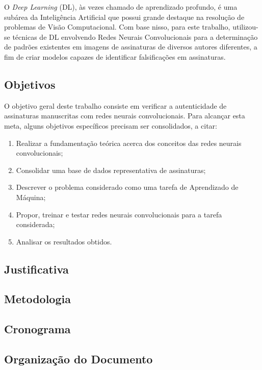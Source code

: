 O \emph{Deep Learning} (DL), às vezes chamado de aprendizado profundo, é uma subárea da Inteligência Artificial que possui grande destaque na resolução de problemas de Visão Computacional. Com base nisso, para este trabalho, utilizou-se técnicas de DL envolvendo Redes Neurais Convolucionais para a determinação de padrões existentes em imagens de assinaturas de diversos autores diferentes, a fim de criar modelos capazes de identificar falsificações em assinaturas.


\subsection{Objetivos}

O objetivo geral deste trabalho consiste em verificar a autenticidade de assinaturas manuscritas com redes neurais convolucionais. Para alcançar esta meta, alguns objetivos específicos precisam ser consolidados, a citar:

\begin{enumerate}
  \item Realizar a fundamentação teórica acerca dos conceitos das redes neurais convolucionais;
  \item Consolidar uma base de dados representativa de assinaturas;
  \item Descrever o problema considerado como uma tarefa de Aprendizado de Máquina;
  \item Propor, treinar e testar redes neurais convolucionais para a tarefa considerada;
  \item Analisar os resultados obtidos.
\end{enumerate}

\subsection{Justificativa}


\subsection{Metodologia}


\subsection{Cronograma}



\subsection{Organização do Documento}

